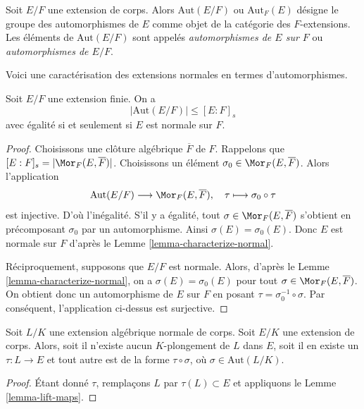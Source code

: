 \begin{definition}
\label{definition-automorphisms}
Soit $E/F$ une extension de corps. Alors $\text{Aut}(E/F)$ ou
$\text{Aut}_F(E)$ désigne le groupe des automorphismes de $E$ comme objet
de la catégorie des $F$-extensions. Les éléments de $\text{Aut}(E/F)$
sont appelés {\it automorphismes de $E$ sur $F$} ou
{\it automorphismes de $E/F$}.
\end{definition}

\noindent
Voici une caractérisation des extensions normales en termes d'automorphismes.

\begin{lemma}
\label{lemma-normal-and-automorphisms}
Soit $E/F$ une extension finie. On a
$$
|\text{Aut}(E/F)| \leq [E : F]_s
$$
avec égalité si et seulement si $E$ est normale sur $F$.
\end{lemma}

\begin{proof}
Choisissons une clôture algébrique $\overline{F}$ de $F$. Rappelons que
$[E : F]_s = |\Mor_F(E, \overline{F})|$. Choisissons un élément
$\sigma_0 \in \Mor_F(E, \overline{F})$. Alors l'application
$$
\text{Aut}(E/F) \longrightarrow \Mor_F(E, \overline{F}),\quad
\tau \longmapsto \sigma_0 \circ \tau
$$
est injective. D'où l'inégalité. S'il y a égalité, tout
$\sigma \in \Mor_F(E, \overline{F})$ s'obtient en précomposant
$\sigma_0$ par un automorphisme. Ainsi $\sigma(E) = \sigma_0(E)$.
Donc $E$ est normale sur $F$ d'après le Lemme \ref{lemma-characterize-normal}.

\medskip\noindent
Réciproquement, supposons que $E/F$ est normale. Alors, d'après le
Lemme \ref{lemma-characterize-normal}, on a $\sigma(E) = \sigma_0(E)$
pour tout $\sigma \in \Mor_F(E, \overline{F})$.
On obtient donc un automorphisme de $E$ sur $F$ en posant
$\tau = \sigma_0^{-1} \circ \sigma$. Par conséquent, l'application ci-dessus
est surjective.
\end{proof}

\begin{lemma}
\label{lemma-normal-embeddings-differ-by-aut}
Soit $L/K$ une extension algébrique normale de corps.
Soit $E/K$ une extension de corps. Alors, soit
il n'existe aucun $K$-plongement de $L$ dans $E$, soit
il en existe un $\tau : L \to E$ et tout autre
est de la forme $\tau \circ \sigma$, où $\sigma \in \text{Aut}(L/K)$.
\end{lemma}

\begin{proof}
Étant donné $\tau$, remplaçons $L$ par $\tau(L) \subset E$ et appliquons le
Lemme \ref{lemma-lift-maps}.
\end{proof}





